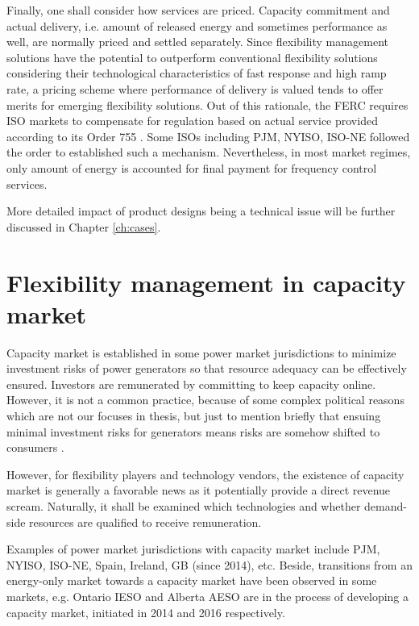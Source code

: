 Finally, one shall consider how services are priced. Capacity commitment and actual delivery, i.e. amount of released energy and sometimes performance as well, are normally priced and settled separately. Since flexibility management solutions have the potential to outperform conventional flexibility solutions considering their technological characteristics of fast response and high ramp rate, a pricing scheme where performance of delivery is valued tends to offer merits for emerging flexibility solutions. Out of this rationale, the FERC requires ISO markets to compensate for regulation based on actual service provided
according to its Order 755 \cite{FERC755}. Some ISOs including PJM, NYISO, ISO-NE followed the order to established such a mechanism. Nevertheless, in most market regimes, only amount of energy is accounted for final payment for frequency control services.

More detailed impact of product designs being a technical issue will be further discussed in Chapter \ref{ch:cases}.

\section{Flexibility management in capacity market}
\label{sec:CM}

Capacity market is established in some power market jurisdictions to minimize investment risks of power generators so that resource adequacy can be effectively ensured. Investors are remunerated by committing to keep capacity online. However, it is not a common practice, because of some complex political reasons which are not our focuses in thesis, but just to mention briefly that ensuing minimal investment risks for generators means risks are somehow shifted to consumers \cite{Cochran2013}. 

However, for flexibility players and technology vendors, the existence of capacity market is generally a favorable news as it potentially provide a direct revenue scream. Naturally, it shall be examined which technologies and whether demand-side resources are qualified to receive remuneration.

Examples of power market jurisdictions with capacity market include PJM, NYISO, ISO-NE, Spain, Ireland, GB (since 2014), etc. Beside, transitions from an energy-only market towards a capacity market have been observed in some markets, e.g. Ontario IESO and Alberta AESO are in the process of developing a capacity market, initiated in 2014 and 2016 respectively. 

